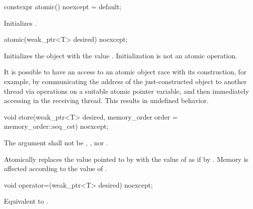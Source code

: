 %
\begin{itemdecl}
constexpr atomic() noexcept = default;
\end{itemdecl}

\begin{itemdescr}
\pnum
\effects
Initializes .
\end{itemdescr}

%
\begin{itemdecl}
atomic(weak_ptr<T> desired) noexcept;
\end{itemdecl}

\begin{itemdescr}
\pnum
\effects
Initializes the object with the value .
Initialization is not an atomic operation.
\begin{note}
It is possible to have an access to
an atomic object  race with its construction,
for example,
by communicating the address of the just-constructed object 
to another thread via  operations
on a suitable atomic pointer variable, and
then immediately accessing  in the receiving thread.
This results in undefined behavior.
\end{note}
\end{itemdescr}

%
\begin{itemdecl}
void store(weak_ptr<T> desired, memory_order order = memory_order::seq_cst) noexcept;
\end{itemdecl}

\begin{itemdescr}
\pnum
\requires
The  argument shall not be
,
, nor
.

\pnum
\effects
Atomically replaces the value pointed to by  with
the value of  as if by .
Memory is affected according to the value of .
\end{itemdescr}

%
\begin{itemdecl}
void operator=(weak_ptr<T> desired) noexcept;
\end{itemdecl}

\begin{itemdescr}
\pnum
\effects
Equivalent to .
\end{itemdescr}

